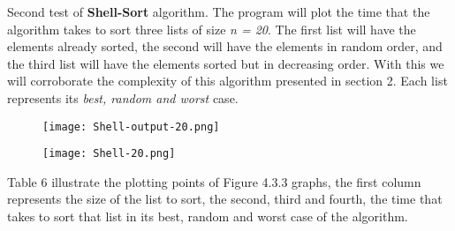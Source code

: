 {\bfseries\itshape\color{carmine}{Observation:}} {\itshape{}}

\pagebreak

Second test of {\bfseries Shell-Sort} algorithm. The program will plot the time that the algorithm takes to sort three lists of size {\itshape n = 20}. The first list will have the elements already sorted, the second will have the elements in random order, and the third list will have the elements sorted but in decreasing order. With this we will corroborate the complexity of this algorithm presented in section 2. Each list represents its {\itshape best, random and worst} case. \hfill \break

\begin{figure}[H]
\texttt{[image: Shell-output-20.png]}
\centering \linebreak {}
\end{figure}

\begin{figure}[H]
\texttt{[image: Shell-20.png]}
\centering \linebreak {}
\end{figure} \pagebreak

Table 6 illustrate the plotting points of Figure 4.3.3 graphs, the first column represents the size of the list to sort, the second, third and fourth, the time that takes to sort that list in its best, random and worst case of the algorithm. \hfill \break

